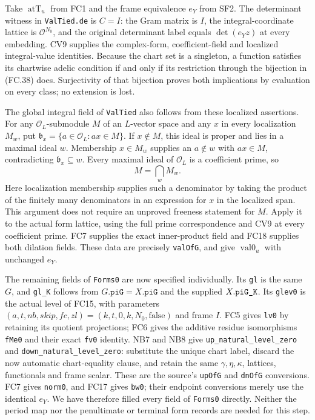 \documentclass[11pt,a4paper]{article}
\numberwithin{equation}{section}
\theoremstyle{remark}\newtheorem{remark}[theorem]{Remark}
\begin{document}
Take $\operatorname{atT}_u$ from FC1 and the frame equivalence $e_Y$
from SF2. The determinant witness in \texttt{ValTied.de} is $C=I$:
the Gram matrix is $I$, the integral-coordinate lattice is
$\mathcal O^{N_0}$, and the original determinant label equals
$\det(e_Y z)$ at every embedding. CV9 supplies the complex-form,
coefficient-field and localized integral-value identities.
Because the chart set is a singleton, a function satisfies its
chartwise adelic condition if and only if its restriction through
the bijection in (FC.38) does. Surjectivity of that bijection proves
both implications by evaluation on every class; no extension is lost.

The global integral field of \texttt{ValTied} also follows from
these localized assertions. For any $\mathcal O_L$-submodule $M$
of an $L$-vector space and any $x$ in every localization $M_w$,
put $\mathfrak b_x=\{a\in\mathcal O_L:ax\in M\}$.
If $x\notin M$, this ideal is proper and lies in a maximal ideal
$w$. Membership $x\in M_w$ supplies an $a\notin w$ with
$ax\in M$, contradicting $\mathfrak b_x\subseteq w$.
Every maximal ideal of $\mathcal O_L$ is a coefficient prime, so
\[
                         M=\bigcap_w M_w.           \tag{FC.39}
\]
Here localization membership supplies such a denominator by taking
the product of the finitely many denominators in an expression for
$x$ in the localized span. This argument does not require an
unproved freeness statement for $M$.
Apply it to the actual form lattice, using the full prime correspondence
and CV9 at every coefficient prime. FC7 supplies the exact inner-product
field and FC18 supplies both dilation fields. These data are precisely
\texttt{valOfG}, and give $\operatorname{val0}_u$ with unchanged $e_Y$.

The remaining fields of \texttt{Forms0} are now specified individually.
Its \texttt{gl} is the same $G$, and \texttt{gl\_\allowbreak K} follows from
$G.\texttt{piG}=X.\texttt{piG}$ and the supplied
$X.\texttt{piG\_\allowbreak K}$. Its \texttt{glev0} is the actual level of FC15,
with parameters
$(a,t,nb,skip,fc,zl)=(k,t,0,k,N_0,\mathrm{false})$ and frame $I$.
FC5 gives \texttt{lv0} by retaining its quotient projections;
FC6 gives the additive residue isomorphisms \texttt{fMe0} and
their exact \texttt{fv0} identity. NB7 and NB8 give
\texttt{up\_\allowbreak natural\_\allowbreak level\_\allowbreak zero} and
\texttt{down\_\allowbreak natural\_\allowbreak level\_\allowbreak zero}: substitute the unique chart
label, discard the now automatic chart-equality clause, and retain
the same $\gamma,\eta,\kappa$, lattices, functionals and frame scalar.
These are the source's \texttt{upOfG} and \texttt{dnOfG} conversions.
FC7 gives \texttt{norm0}, and FC17 gives \texttt{bw0}; their endpoint
conversions merely use the identical $e_Y$. We have therefore filled
every field of \texttt{Forms0} directly. Neither the period map nor
the penultimate or terminal form records are needed for this step.
\end{document}
